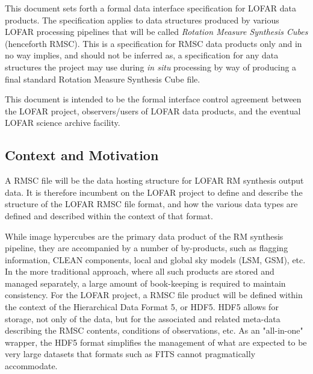 \documentclass[a4paper,10pt,bibtotoc]{scrartcl}
\begin{document}
This document sets forth a formal data interface specification for LOFAR data products.  The specification applies to data structures produced by various LOFAR processing pipelines that will be called \textsl{Rotation Measure Synthesis Cubes} (henceforth RMSC).  This is a specification for RMSC data products only and in no way implies, and should not be inferred as, a specification for any data structures the project may use during \textit{in situ} processing by way of producing a final standard Rotation Measure Synthesis Cube file.

This document is intended to be the formal interface control agreement between the LOFAR project, observers/users of LOFAR data products, and the eventual LOFAR science archive facility.

\subsection{Context and Motivation}
\label{sec:context and motivation}

A RMSC file will be the data hosting structure for LOFAR RM synthesis output data. It is therefore incumbent on the LOFAR project to define and describe the structure of the LOFAR RMSC file format, and how the various data types are defined and described within the context of that format.

While image hypercubes are the primary data product of the RM synthesis pipeline, they are accompanied by a number of by-products, such as flagging information, CLEAN components, local and global sky models (LSM, GSM), etc.  In the  more traditional approach, where all such products are stored and managed separately, a large amount of book-keeping is required to maintain consistency.  For the LOFAR project, a RMSC file product will be defined within the context of  the Hierarchical Data Format 5, or HDF5. HDF5 allows for storage, not only of the data, but for the associated and related meta-data describing the RMSC contents, conditions of observations, etc. As an "all-in-one" wrapper, the HDF5 format simplifies the management of what are expected to be very large datasets that formats such as FITS cannot pragmatically accommodate.

\end{document}

